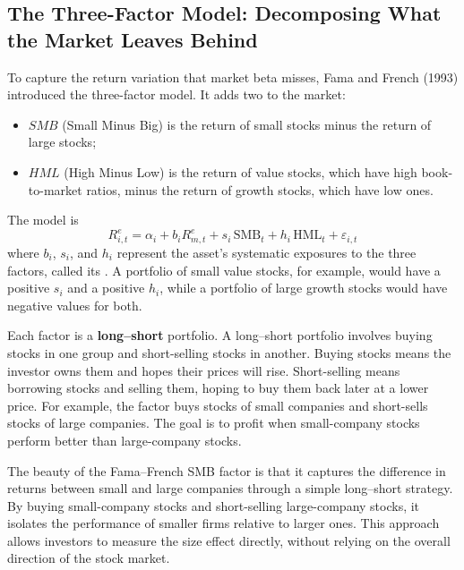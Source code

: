 \subsection{The Three-Factor Model: Decomposing What the Market Leaves Behind}
\label{sec:04-factors}
To capture the return variation that market beta misses, Fama and French (1993) introduced the three-factor model. It adds two  to the market:
\begin{itemize}
  \item $SMB$ (Small Minus Big) is the return of small stocks minus the return of large stocks;
  \item $HML$ (High Minus Low) is the return of value stocks, which have high book-to-market ratios, minus the return of growth stocks, which have low ones.
\end{itemize}
The model is
\begin{equation}
  R^{e}_{i,t} = \alpha_i + b_i R^{e}_{m,t} + s_i \,\mathrm{SMB}_t + h_i \,\mathrm{HML}_t + \varepsilon_{i,t}
  \label{eq:04-ff3}
\end{equation}
where $b_i$, $s_i$, and $h_i$ represent the asset's systematic exposures to the three factors, called its . A portfolio of small value stocks, for example, would have a positive $s_i$ and a positive $h_i$, while a portfolio of large growth stocks would have negative values for both.

Each factor is a \textbf{long--short} portfolio. 
A long--short portfolio involves buying stocks in one group and short-selling stocks in another. Buying stocks means the investor owns them and hopes their prices will rise. Short-selling means borrowing stocks and selling them, hoping to buy them back later at a lower price. For example, the  factor buys stocks of small companies and short-sells stocks of large companies. The goal is to profit when small-company stocks perform better than large-company stocks.

The beauty of the Fama--French SMB factor is that it captures the difference in returns between small and large companies through a simple long--short strategy. By buying small-company stocks and short-selling large-company stocks, it isolates the performance of smaller firms relative to larger ones. This approach allows investors to measure the size effect directly, without relying on the overall direction of the stock market.


